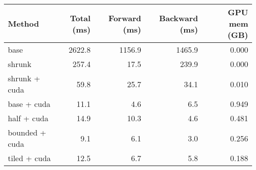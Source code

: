 \begin{tabular}{lrrrr}
\hline
 Method         &   Total (ms) &   Forward (ms) &   Backward (ms) &   GPU mem (GB) \\
\hline
 base           &       2622.8 &         1156.9 &          1465.9 &          0.000 \\
 shrunk         &        257.4 &           17.5 &           239.9 &          0.000 \\
 shrunk + cuda  &         59.8 &           25.7 &            34.1 &          0.010 \\
 base + cuda    &         11.1 &            4.6 &             6.5 &          0.949 \\
 half + cuda    &         14.9 &           10.3 &             4.6 &          0.481 \\
 bounded + cuda &          9.1 &            6.1 &             3.0 &          0.256 \\
 tiled + cuda   &         12.5 &            6.7 &             5.8 &          0.188 \\
\hline
\end{tabular}
